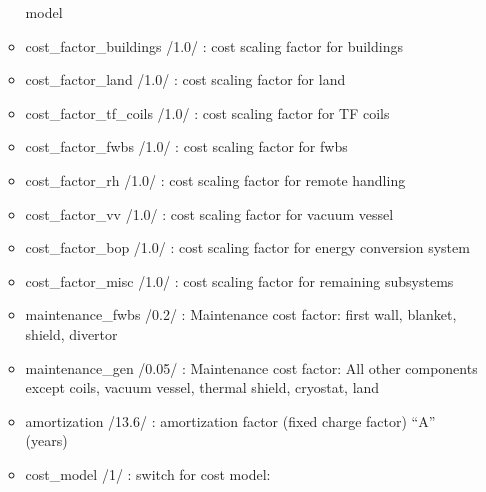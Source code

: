 \documentclass[]{article}
\begin{document}
\begin{itemize}
\begin{itemize}
    model
  \item
    cost\_factor\_buildings /1.0/ : cost scaling factor for buildings
  \item
    cost\_factor\_land /1.0/ : cost scaling factor for land
  \item
    cost\_factor\_tf\_coils /1.0/ : cost scaling factor for TF coils
  \item
    cost\_factor\_fwbs /1.0/ : cost scaling factor for fwbs
  \item
    cost\_factor\_rh /1.0/ : cost scaling factor for remote handling
  \item
    cost\_factor\_vv /1.0/ : cost scaling factor for vacuum vessel
  \item
    cost\_factor\_bop /1.0/ : cost scaling factor for energy conversion
    system
  \item
    cost\_factor\_misc /1.0/ : cost scaling factor for remaining
    subsystems
  \item
    maintenance\_fwbs /0.2/ : Maintenance cost factor: first wall,
    blanket, shield, divertor
  \item
    maintenance\_gen /0.05/ : Maintenance cost factor: All other
    components except coils, vacuum vessel, thermal shield, cryostat,
    land
  \item
    amortization /13.6/ : amortization factor (fixed charge factor)
    ``A'' (years)
  \item
    cost\_model /1/ : switch for cost model:


\end{itemize}
\end{itemize}
\end{document}
